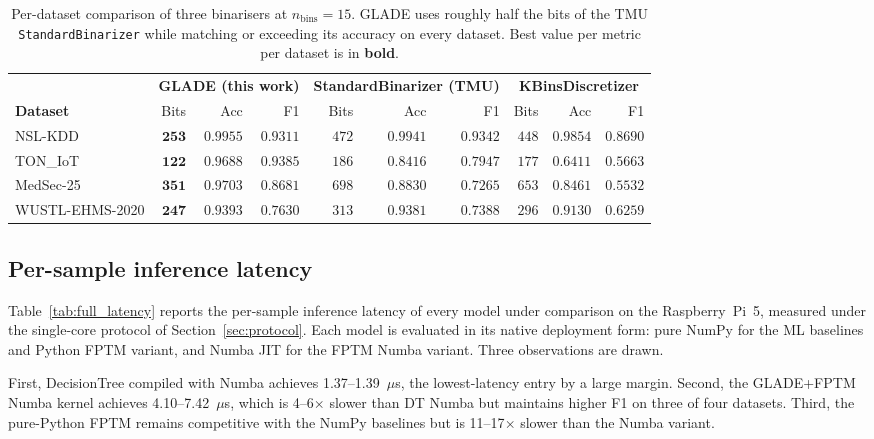 \documentclass[journal,10pt]{IEEEtran}
\begin{document}
\begin{table}[t]
\centering\small
\caption{Per-dataset comparison of three binarisers at
         $n_\text{bins}=15$. GLADE uses roughly half the bits of the
         TMU \texttt{StandardBinarizer} while matching or exceeding
         its accuracy on every dataset. Best value per metric per
         dataset is in \textbf{bold}.}
\label{tab:binarizer_comparison}
\begin{tabular}{lrrrrrrrrr}
\toprule
 & \multicolumn{3}{c}{\textbf{GLADE (this work)}}
 & \multicolumn{3}{c}{\textbf{StandardBinarizer (TMU)}}
 & \multicolumn{3}{c}{\textbf{KBinsDiscretizer}} \\
\cmidrule(lr){2-4} \cmidrule(lr){5-7} \cmidrule(lr){8-10}
\textbf{Dataset} & Bits & Acc & F1 & Bits & Acc & F1 & Bits & Acc & F1 \\
\midrule
NSL-KDD         & $\mathbf{253}$ & $\mathbf{0.9955}$ & $0.9311$          & $472$ & $0.9941$ & $\mathbf{0.9342}$ & $448$ & $0.9854$ & $0.8690$ \\
TON\_IoT        & $\mathbf{122}$ & $\mathbf{0.9688}$ & $\mathbf{0.9385}$ & $186$ & $0.8416$ & $0.7947$          & $177$ & $0.6411$ & $0.5663$ \\
MedSec-25       & $\mathbf{351}$ & $\mathbf{0.9703}$ & $\mathbf{0.8681}$ & $698$ & $0.8830$ & $0.7265$          & $653$ & $0.8461$ & $0.5532$ \\
WUSTL-EHMS-2020 & $\mathbf{247}$ & $\mathbf{0.9393}$ & $\mathbf{0.7630}$ & $313$ & $0.9381$ & $0.7388$          & $296$ & $0.9130$ & $0.6259$ \\
\bottomrule
\end{tabular}
\end{table}

\subsection{Per-sample inference latency}
\label{sec:res-latency}

Table~\ref{tab:full_latency} reports the per-sample inference latency
of every model under comparison on the Raspberry~Pi~5, measured under
the single-core protocol of Section~\ref{sec:protocol}. Each model is
evaluated in its native deployment form: pure NumPy for the ML baselines and
Python FPTM variant, and Numba JIT for the FPTM Numba variant. Three observations are drawn.

First, DecisionTree compiled with Numba achieves 1.37--1.39~$\mu$s, the
lowest-latency entry by a large margin. Second, the GLADE+FPTM Numba
kernel achieves 4.10--7.42~$\mu$s, which is 4--6$\times$ slower than DT
Numba but maintains higher F1 on three of four datasets. Third, the
pure-Python FPTM remains competitive with the NumPy baselines but is
11--17$\times$ slower than the Numba variant.
\end{document}
